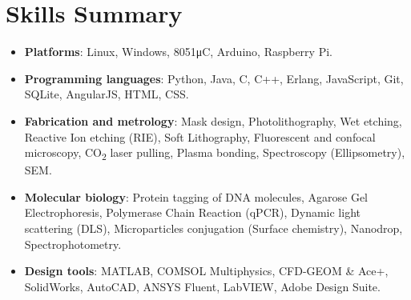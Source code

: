\documentclass[a4paper,20pt]{article}
\newcommand{\resumeItem}[2]{
  \item\small{
    \textbf{#1}{: #2 \vspace{-2pt}}
  }
}
\newcommand{\resumeSubItem}[2]{\resumeItem{#1}{#2}\vspace{-3pt}}
\newcommand{\resumeSubHeadingListStart}{\begin{itemize}[leftmargin=*]}
\newcommand{\resumeSubHeadingListEnd}{\end{itemize}}
\begin{document}
\section{Skills Summary}
	\resumeSubHeadingListStart
	\vspace{2pt}
	\resumeSubItem{Platforms}{Linux, Windows, 8051\si{\micro C}, Arduino, Raspberry Pi.}
	\vspace{2pt}
	\resumeSubItem{Programming languages}{Python, Java, C, C++, Erlang, JavaScript, Git, SQLite, AngularJS, HTML, CSS.}
	\vspace{2pt}
	\resumeSubItem{Fabrication and metrology}{Mask design, Photolithography, Wet etching, Reactive Ion etching (RIE), Soft Lithography, Fluorescent and confocal microscopy, CO\textsubscript{2} laser pulling, Plasma bonding, Spectroscopy (Ellipsometry), SEM.}
	\vspace{2pt}
	\resumeSubItem{Molecular biology}{Protein tagging
of DNA molecules, Agarose Gel Electrophoresis, Polymerase Chain Reaction (qPCR), Dynamic light scattering (DLS), Microparticles conjugation (Surface chemistry), Nanodrop, Spectrophotometry.}
\vspace{2pt}
	\resumeSubItem{Design tools}{MATLAB, COMSOL Multiphysics, CFD-GEOM \& Ace+, SolidWorks, AutoCAD, ANSYS Fluent, LabVIEW, Adobe Design Suite.}
\resumeSubHeadingListEnd
\vspace{5pt}

\end{document}
